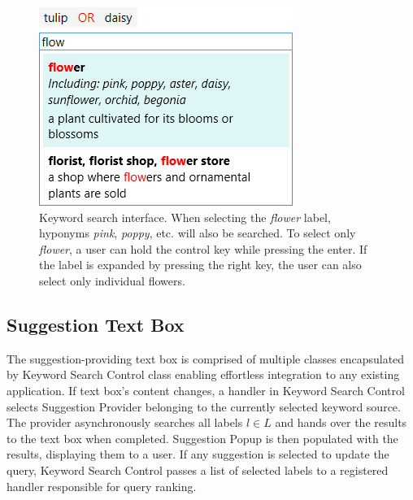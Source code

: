 \begin{figure}[ht]
	\centering
	\includegraphics[scale=0.5]{img/keyword-textbox.png}
	
	\caption[Keyword search interface]{Keyword search interface. When selecting the \textit{flower} label, hyponyms \textit{pink}, \textit{poppy}, etc. will also be searched. To select only \textit{flower}, a user can hold the control key while pressing the enter. If the label is expanded by pressing the right key, the user can also select only individual flowers.}
	\label{fig:keyword-textbox}
\end{figure}

\subsection{Suggestion Text Box}
The suggestion-providing text box is comprised of multiple classes encapsulated by Keyword Search Control class enabling effortless integration to any existing application. If text box's content changes, a handler in Keyword Search Control selects Suggestion Provider belonging to the currently selected keyword source. The provider asynchronously searches all labels $l\in L$ and hands over the results to the text box when completed. Suggestion Popup is then populated with the results, displaying them to a user. If any suggestion is selected to update the query, Keyword Search Control passes a list of selected labels to a registered handler responsible for query ranking.

